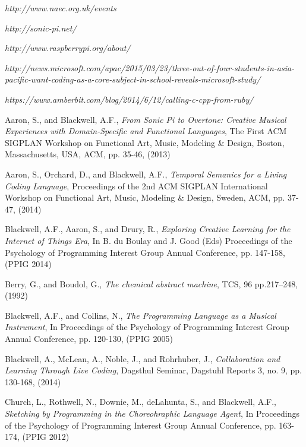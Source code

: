 \documentclass[11pt, abstracton, twoside, titlepage=true]{scrartcl}
\begin{document}
\begin{thebibliography}{9}
\thispagestyle{empty}

  \emph{http://www.naec.org.uk/events}

  \emph{http://sonic-pi.net/}

  \emph{http://www.raspberrypi.org/about/}

  \emph{http://news.microsoft.com/apac/2015/03/23/three-out-of-four-students-in-asia-pacific-want-coding-as-a-core-subject-in-school-reveals-microsoft-study/}

  \emph{https://www.amberbit.com/blog/2014/6/12/calling-c-cpp-from-ruby/}

  Aaron, S., and Blackwell, A.F.,
  \emph{From Sonic Pi to Overtone: Creative Musical Experiences with Domain-Specific and Functional Languages},
  The First ACM SIGPLAN Workshop on Functional Art, Music, Modeling \& Design,
  Boston, Massachusetts, USA,
  ACM, pp. 35-46,
  (2013)

  Aaron, S., Orchard, D., and Blackwell, A.F.,
  \emph{Temporal Semanics for a Living Coding Language},
  Proceedings of the 2nd ACM SIGPLAN International Workshop on Functional Art, Music, Modeling \& Design,
  Sweden, ACM, pp. 37-47,
  (2014)

  Blackwell, A.F., Aaron, S., and Drury, R., 
  \emph{Exploring Creative Learning for the Internet of Things Era},
  In B. du Boulay and J. Good (Eds) Proceedings of the Psychology of Programming Interest Group Annual Conference, 
  pp. 147-158,
  (PPIG 2014)

  Berry, G., and Boudol, G.,
  \emph{The chemical abstract machine},
  TCS, 96 pp.217–248, 
  (1992)

  Blackwell, A.F., and Collins, N.,
  \emph{The Programming Language as a Musical Instrument},
  In Proceedings of the Psychology of Programming Interest Group Annual Conference,
  pp. 120-130,
  (PPIG 2005)

  Blackwell, A., McLean, A., Noble, J., and Rohrhuber, J.,
  \emph{Collaboration and Learning Through Live Coding},
  Dagsthul Seminar, Dagstuhl Reports 3,
  no. 9, pp. 130-168,
  (2014)

  Church, L., Rothwell, N., Downie, M., deLahunta, S., and Blackwell, A.F.,
  \emph{Sketching by Programming in the Choreohraphic Language Agent},
  In Proceedings of the Psychology of Programming Interest Group Annual Conference,
  pp. 163-174,
  (PPIG 2012)


\end{thebibliography}
\end{document}
